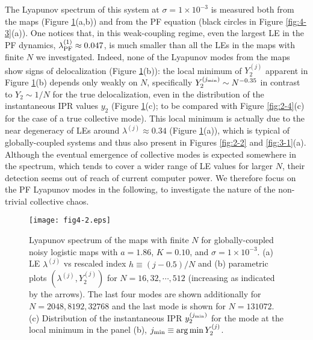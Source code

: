 \documentclass[12pt]{iopart}
\begin{document}
The Lyapunov spectrum of this system at $\sigma = 1 \times 10^{-3}$
 is measured both from the maps (Figure \ref{fig:4-2}(a,b))
 and from the PF equation (black circles in Figure \ref{fig:4-3}(a)).
One notices that, in this weak-coupling regime,
 even the largest LE in the PF dynamics,
 $\lambda_{\rm PF}^{(1)} \approx 0.047$, is much smaller
 than all the LEs in the maps with finite $N$ we investigated.
Indeed, none of the Lyapunov modes from the maps
 show signs of delocalization (Figure \ref{fig:4-2}(b)):
 the local minimum of $Y_2^{(j)}$ apparent in Figure \ref{fig:4-2}(b)
 depends only weakly on $N$, specifically $Y_2^{(j_{\rm min})} \sim N^{-0.35}$
 in contrast to $Y_2 \sim 1/N$ for the true delocalization,
 even in the distribution of the instantaneous IPR values $y_2$
 (Figure \ref{fig:4-2}(c); to be compared with Figure \ref{fig:2-4}(c)
 for the case of a true collective mode).
This local minimum is actually due to the near degeneracy of LEs
 around $\lambda^{(j)} \approx 0.34$ (Figure \ref{fig:4-2}(a)),
 which is typical of globally-coupled systems \cite{Takeuchi.etal-PRL2011}
 and thus also present in Figures \ref{fig:2-2} and \ref{fig:3-1}(a).
Although the eventual emergence of collective modes is expected
 somewhere in the spectrum,
 which tends to cover a wider range of LE values for larger $N$,
 their detection seems out of reach of current computer power.
We therefore focus on the PF Lyapunov modes in the following,
 to investigate the nature of the non-trivial collective chaos.

\begin{figure}[t]
  \texttt{[image: fig4-2.eps]}
  \caption{Lyapunov spectrum of the maps with finite $N$ for globally-coupled noisy logistic maps  with $a=1.86$, $K=0.10$, and $\sigma = 1 \times 10^{-3}$. (a) LE $\lambda^{(j)}$ vs rescaled index $h \equiv (j-0.5)/N$ and (b) parametric plots $(\lambda^{(j)}, Y_2^{(j)})$ for $N = 16, 32, \cdots, 512$ (increasing as indicated by the arrows). The last four modes are shown additionally for $N = 2048, 8192, 32768$ and the last mode is shown for $N = 131072$. (c) Distribution of the instantaneous IPR $y_2^{(j_{\rm min})}$ for the mode at the local minimum in the panel (b), $j_{\rm min} \equiv \arg\min Y_2^{(j)}$.}
  \label{fig:4-2}
\end{figure}%
\end{document}
